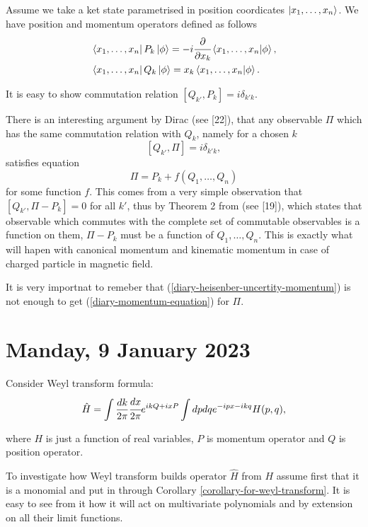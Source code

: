\documentclass[main.tex]{subfiles}
\begin{document}
Assume we take a ket state parametrised in position coordicates $\ket{x_1, \dots, x_n}$. We have position and momentum operators defined as follows
\begin{align}
\label{diary-momentum-equation}
& \bra{x_1, \dots, x_n}P_k \ket{\phi} = -i\cfrac{\partial}{\partial x_k} \bra{x_1, \dots, x_n}\ket{\phi},\\
& \bra{x_1, \dots, x_n}Q_k \ket{\phi} = x_k \bra{x_1, \dots, x_n}\ket{\phi}.
\end{align}

It is easy to show commutation relation $[Q_{k'}, P_{k}] = i\delta_{k'k}$.

There is an interesting argument by Dirac (see \cite{dirac1981}[22]), that any observable $\Pi$ which has the same commutation relation with $Q_k$, namely for a chosen $k$
\begin{equation}
\label{diary-heisenber-uncertity-momentum}
[Q_{k'}, \Pi] = i\delta_{k'k},
\end{equation}
satisfies equation
\begin{equation}
\Pi = P_k + f(Q_1, \dots, Q_n)
\end{equation}
for some function $f$.
This comes from a very simple observation that $[Q_{k'}, \Pi - P_k] = 0$ for all $k'$, thus
by Theorem 2 from (see \cite{dirac1981}[19]), which states that observable which commutes with the complete set of commutable observables is a function on them, $\Pi - P_k$ must be a function of $Q_1, \dots, Q_n$. This is exactly what will hapen with canonical momentum and kinematic momentum in case of charged particle in magnetic field.

It is very importnat to remeber that (\ref{diary-heisenber-uncertity-momentum}) is not enough to get (\ref{diary-momentum-equation}) for $\Pi$.

\section{Manday, 9 January 2023}

Consider Weyl transform formula:
\begin{equation}
\hat{H} = \int \frac{dk}{2\pi} \cfrac{dx}{2\pi} e^{ikQ + ixP} \int dpdq e^{-ipx -ikq} H(p, q),
\end{equation}

where $H$ is just a function of real variables, $P$ is momentum operator and $Q$ is position operator.

To investigate how Weyl transform builds operator $\hat{H}$ from $H$ assume first that it is a monomial and put in through Corollary \ref{corollary-for-weyl-transform}. It is easy to see from it how it will act on multivariate polynomials and by extension on all their limit functions.
\end{document}
